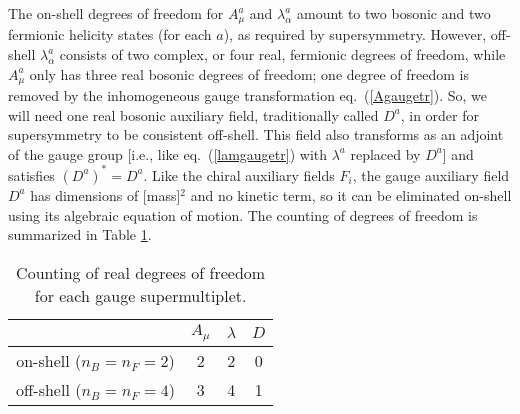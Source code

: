 \documentclass[11pt]{article}
\begin{document}
The on-shell degrees of freedom for $A^a_\mu$ and $\lambda^a_\alpha$
amount to two bosonic and two fermionic helicity states (for each $a$), as
required by supersymmetry. However, off-shell $\lambda^a_\alpha$ consists
of two complex, or four real, fermionic degrees of freedom, while
$A^a_\mu$ only has three real bosonic degrees of freedom; one degree of
freedom is removed by the inhomogeneous gauge transformation
eq.~(\ref{Agaugetr}). So, we will need one real bosonic auxiliary field,
traditionally called $D^a$, in order for supersymmetry to be consistent
off-shell. This field also transforms as an adjoint of the gauge group
[i.e., like eq.~(\ref{lamgaugetr}) with $\lambda^a$ replaced by $D^a$] and
satisfies $(D^a)^* = D^a$. Like the chiral auxiliary fields $F_i$, the
gauge auxiliary field $D^a$ has dimensions of [mass]$^2$ and no kinetic
term, so it can be eliminated on-shell using its algebraic equation of
motion. The counting of degrees of freedom is summarized in Table
\ref{table:gaugedofcounting}.
\renewcommand{\arraystretch}{1.45}
\begin{table}[tb]
\begin{center}
\begin{tabular}{|c|c|c|c|}
\hline
 & $A_\mu$ & $\lambda$ & $D$ \\
\hline
on-shell ($n_B=n_F=2$) & 2 & 2 & 0 \\
\hline
off-shell ($n_B=n_F=4$) & 3 & 4 & 1 \\
\hline
\end{tabular}
\caption{Counting of real degrees of freedom for each gauge
supermultiplet. \label{table:gaugedofcounting}}
\vspace{-0.4cm}
\end{center}
\end{table}
\end{document}
